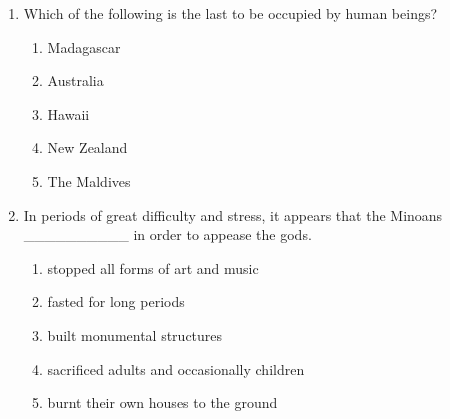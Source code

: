 \documentclass[12pt]{article}
\begin{document}
\begin{enumerate}[label=\arabic*.]
\item Which of the following is the last to be occupied by human beings?
\begin{enumerate}[label=(\alph*)]
    \item Madagascar
    \item Australia
    \item Hawaii
    \item New Zealand
    \item The Maldives
\end{enumerate}
\item In periods of great difficulty and stress, it appears that the Minoans \_\_\_\_\_\_\_\_\_\_ in order to appease the gods.
\begin{enumerate}[label=(\alph*)]
    \item stopped all forms of art and music
    \item fasted for long periods
    \item built monumental structures
    \item sacrificed adults and occasionally children
    \item burnt their own houses to the ground
\end{enumerate}
\end{enumerate}
\end{document}
